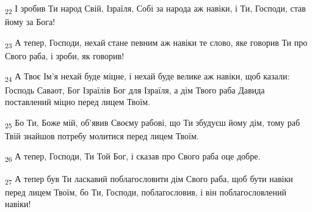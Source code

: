 \begin{tcolorbox}
\textsubscript{22} І зробив Ти народ Свій, Ізраїля, Собі за народа аж навіки, і Ти, Господи, став йому за Бога!
\end{tcolorbox}
\begin{tcolorbox}
\textsubscript{23} А тепер, Господи, нехай стане певним аж навіки те слово, яке говорив Ти про Свого раба, і зроби, як говорив!
\end{tcolorbox}
\begin{tcolorbox}
\textsubscript{24} А Твоє Ім'я нехай буде міцне, і нехай буде велике аж навіки, щоб казали: Господь Саваот, Бог Ізраїлів Бог для Ізраїля, а дім Твого раба Давида поставлений міцно перед лицем Твоїм.
\end{tcolorbox}
\begin{tcolorbox}
\textsubscript{25} Бо Ти, Боже мій, об'явив Своєму рабові, що Ти збудуєш йому дім, тому раб Твій знайшов потребу молитися перед лицем Твоїм.
\end{tcolorbox}
\begin{tcolorbox}
\textsubscript{26} А тепер, Господи, Ти Той Бог, і сказав про Свого раба оце добре.
\end{tcolorbox}
\begin{tcolorbox}
\textsubscript{27} А тепер був Ти ласкавий поблагословити дім Свого раба, щоб бути навіки перед лицем Твоїм, бо Ти, Господи, поблагословив, і він поблагословлений навіки!
\end{tcolorbox}
